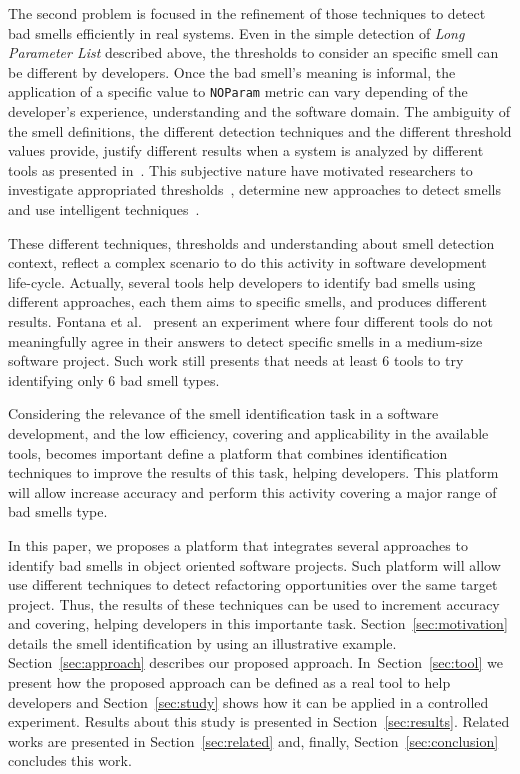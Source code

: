 \documentclass[conference]{IEEEtran}
\begin{document}
The second problem is focused in the refinement of those techniques 
to detect bad smells efficiently in real systems. Even in the simple detection 
of \textit{Long Parameter List} described above, the thresholds to consider an specific 
smell can be different by developers. Once the bad smell's meaning is informal, 
the application of a specific value to \texttt{NOParam} metric can vary 
depending of the developer's experience, understanding and the software 
domain. The ambiguity of the smell definitions, the different 
detection techniques and the different threshold values provide, justify 
different results when a system is analyzed by different tools as presented 
in~\cite{Fontana2012c}. This subjective nature have motivated researchers to 
investigate appropriated thresholds~\cite{Paloma:2014,Kessentini2010c}, 
determine new approaches to detect smells~\cite{Palomba2013d,Ouni2013h} and use 
intelligent techniques~\cite{Khomh2009c,Ouni2012f}.

These different techniques, thresholds and understanding about smell 
detection context, reflect a complex scenario to do this activity in software 
development life-cycle. Actually, several tools help developers to identify bad 
smells using different approaches, each them aims to specific smells, and 
produces different results. Fontana et al.~\cite{Fontana2012c} 
present an experiment where four different tools do not meaningfully agree in 
their answers to detect specific smells in a medium-size software project. Such 
work still presents that needs at least 6 tools to try identifying only 6
bad smell types.

Considering the relevance of the smell identification task in a software 
development, and the low efficiency, covering and 
applicability in the available tools, becomes important define a platform that 
combines identification techniques to improve the results of this task, helping 
developers. This platform will allow increase accuracy and perform this 
activity covering a major range of bad smells type.

In this paper, we proposes a platform that integrates several approaches to 
identify bad smells in object oriented software projects. Such platform will 
allow use different techniques to detect refactoring opportunities over the 
same target project. Thus, the results of these techniques can be used to 
increment accuracy and covering, helping developers in this importante task. 
Section~\ref{sec:motivation} details the smell identification by using an 
illustrative example. Section~\ref{sec:approach} describes our proposed 
approach. In~Section~\ref{sec:tool} we present how the proposed approach can be 
defined as a real tool to help developers and Section~\ref{sec:study} shows how 
it can be applied in a controlled experiment. Results about this study 
is presented in Section~\ref{sec:results}. Related works are presented in 
Section~\ref{sec:related} and, finally, Section~\ref{sec:conclusion} concludes 
this work.
\end{document}
